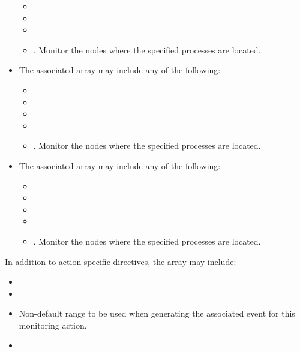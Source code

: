 \begin{itemize}
\begin{itemize}
        \item {}
        \item {}
        \item {}
        \item {}. Monitor the nodes where the specified processes are located.
    \end{itemize}
    \item {} The associated  array may include any of the following:
    \begin{itemize}
        \item {}
        \item {}
        \item {}
        \item {}
        \item {}. Monitor the nodes where the specified processes are located.
    \end{itemize}
    \item {} The associated  array may include any of the following:
    \begin{itemize}
        \item {}
        \item {}
        \item {}
        \item {}
        \item {}. Monitor the nodes where the specified processes are located.
    \end{itemize}
\end{itemize}

In addition to action-specific directives, the  array may include:

\begin{itemize}
    \item {}
    \item {}
    \item {} Non-default range to be used when generating the associated event for this monitoring action.
    \item {}
\end{itemize}
\optattrend

